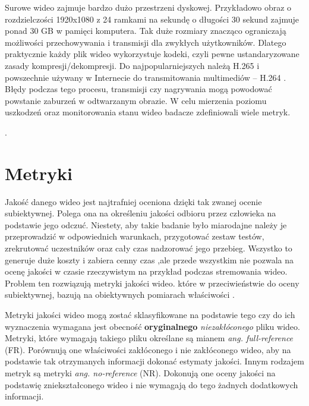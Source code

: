 Surowe wideo zajmuje bardzo dużo przestrzeni dyskowej. Przykładowo obraz o rozdzielczości 1920x1080 z 24 ramkami na sekundę o długości 30 sekund zajmuje ponad 30 GB w pamięci komputera. Tak duże rozmiary znacząco ograniczają możliwości przechowywania i transmisji dla zwykłych użytkowników. Dlatego praktycznie każdy plik wideo wykorzystuje kodeki, czyli pewne ustandaryzowane zasady kompresji/dekompresji. Do najpopularniejszych należą H.265 i powszechnie używany w Internecie do transmitowania multimediów --  H.264 \cite{video_codecs}. Błędy podczas tego procesu, transmisji czy nagrywania mogą powodować powstanie zaburzeń w odtwarzanym obrazie. W celu mierzenia poziomu uszkodzeń oraz monitorowania stanu wideo badacze zdefiniowali wiele metryk.\par.


\section{Metryki}

Jakość danego wideo jest najtrafniej oceniona dzięki tak zwanej ocenie subiektywnej. Polega ona na określeniu jakości odbioru przez człowieka na podstawie jego odczuć. Niestety, aby takie badanie było miarodajne należy je przeprowadzić w odpowiednich warunkach, przygotować zestaw testów, zrekrutować uczestników oraz cały czas nadzorować jego przebieg. Wszystko to generuje duże koszty i zabiera cenny czas ,ale przede wszystkim nie pozwala na ocenę jakości w czasie rzeczywistym na przykład podczas stremowania wideo. Problem ten rozwiązują metryki jakości wideo. które w przeciwieństwie do oceny subiektywnej, bazują na obiektywnych pomiarach właściwości \cite{vqm}.\par
Metryki jakości wideo mogą zostać sklasyfikowane na podstawie tego czy do ich wyznaczenia wymagana jest obecność \textbf{oryginalnego} \textit{niezakłóconego} pliku wideo. Metryki, które wymagają takiego pliku określane są mianem {\em ang. full-reference} (FR). Porównują one właściwości zakłóconego i nie zakłóconego wideo, aby na podstawie tak otrzymanych informacji dokonać estymaty jakości. Innym rodzajem metryk są metryki {\em ang. no-reference} (NR). Dokonują one oceny jakości na podstawię zniekształconego wideo i nie wymagają do tego żadnych dodatkowych informacji\cite{vqm}.\par

